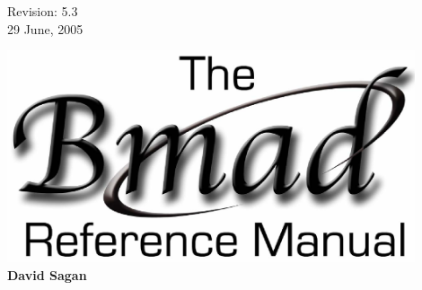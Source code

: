 \thispagestyle{empty}

\begin{flushright}
\large
  Revision: 5.3 \\
  29 June, 2005 \\
\end{flushright}

\vfill

{
\begin{center}
\includegraphics[width=12cm]{bmad_ref_manual.eps} \\
\vskip 0.3in
\huge\bf David Sagan
\end{center}
}

\vfill
\break